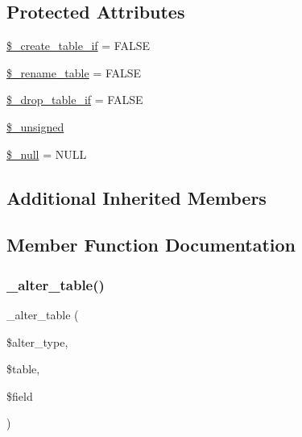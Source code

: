 \subsection*{Protected Attributes}
\begin{DoxyCompactItemize}
\item 
\mbox{\hyperlink{class_c_i___d_b__ibase__forge_a2f6484fcb8d1dc3eef67a637227cd583}{\$\+\_\+create\+\_\+table\+\_\+if}} = F\+A\+L\+SE
\item 
\mbox{\hyperlink{class_c_i___d_b__ibase__forge_a1a649e7cf9de16bcf932977b18bc91de}{\$\+\_\+rename\+\_\+table}} = F\+A\+L\+SE
\item 
\mbox{\hyperlink{class_c_i___d_b__ibase__forge_a92a8a9145a7fc91e252e58d019373581}{\$\+\_\+drop\+\_\+table\+\_\+if}} = F\+A\+L\+SE
\item 
\mbox{\hyperlink{class_c_i___d_b__ibase__forge_aae977ae6d61fa183f0b25422b6ddc31c}{\$\+\_\+unsigned}}
\item 
\mbox{\hyperlink{class_c_i___d_b__ibase__forge_ae58fe6a5104d4a069a49b27533ce808f}{\$\+\_\+null}} = \textquotesingle{}N\+U\+LL\textquotesingle{}
\end{DoxyCompactItemize}
\subsection*{Additional Inherited Members}


\subsection{Member Function Documentation}
\mbox{\label{class_c_i___d_b__ibase__forge_a41c6cae02f2fda8b429ad0afb9509426}} 
\subsubsection{\texorpdfstring{\+\_\+alter\+\_\+table()}{\_alter\_table()}}
{\footnotesize\ttfamily \+\_\+alter\+\_\+table (\begin{DoxyParamCaption}\item[{}]{\$alter\+\_\+type,  }\item[{}]{\$table,  }\item[{}]{\$field }\end{DoxyParamCaption})\hspace{0.3cm}{\ttfamily [protected]}}

